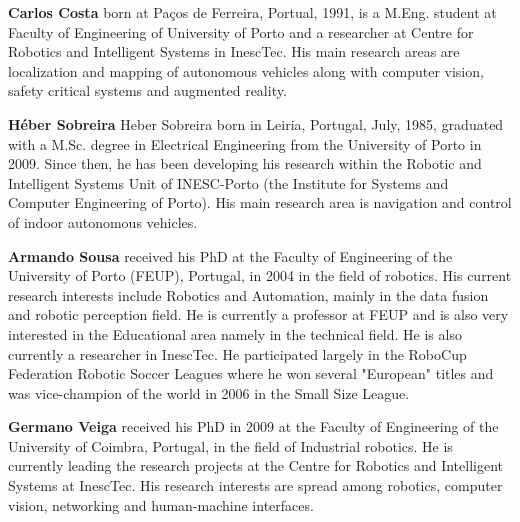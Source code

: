 \textbf{Carlos Costa} born at Paços de Ferreira, Portual, 1991, is a M.Eng. student at Faculty of Engineering of University of Porto and a researcher at Centre for Robotics and Intelligent Systems in InescTec. His main research areas are localization and mapping of autonomous vehicles along with computer vision, safety critical systems and augmented reality.

\textbf{Héber Sobreira} Heber Sobreira born in  Leiria, Portugal, July, 1985, graduated with a M.Sc. degree in Electrical Engineering from the University of Porto in 2009. Since then, he has been developing his research within the Robotic and Intelligent Systems Unit of INESC-Porto (the Institute for Systems and Computer Engineering of Porto). His main research area is navigation and control of indoor autonomous vehicles.

\textbf{Armando Sousa} received his PhD at the Faculty of Engineering of the University of Porto (FEUP), Portugal, in 2004 in the field of robotics. His current research interests include Robotics and Automation, mainly in the data fusion and robotic perception field. He is currently a professor at FEUP and is also very interested in the Educational area namely in the technical field. He is also currently a researcher in InescTec. He participated largely in the RoboCup Federation Robotic Soccer Leagues where he won several "European" titles and was vice-champion of the world in 2006 in the Small Size League.

\textbf{Germano Veiga} received his PhD in 2009 at the Faculty of Engineering of the University of Coimbra, Portugal, in the field of Industrial robotics. He is currently leading the research projects at the Centre for Robotics and Intelligent Systems at InescTec. His research interests are spread among robotics, computer vision, networking and human-machine interfaces.
